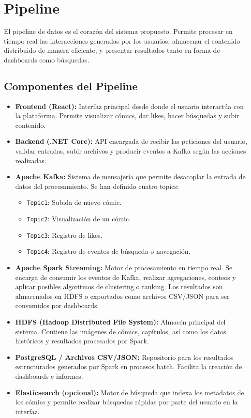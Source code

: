 \section{Pipeline}

El pipeline de datos es el corazón del sistema propuesto. Permite procesar en tiempo real las interacciones generadas por los usuarios, almacenar el contenido distribuido de manera eficiente, y presentar resultados tanto en forma de dashboards como búsquedas.

\subsection*{Componentes del Pipeline}

\begin{itemize}
    \item \textbf{Frontend (React):} Interfaz principal desde donde el usuario interactúa con la plataforma. Permite visualizar cómics, dar likes, hacer búsquedas y subir contenido.
    
    \item \textbf{Backend (.NET Core):} API encargada de recibir las peticiones del usuario, validar entradas, subir archivos y producir eventos a Kafka según las acciones realizadas.
    
    \item \textbf{Apache Kafka:} Sistema de mensajería que permite desacoplar la entrada de datos del procesamiento. Se han definido cuatro topics:
    \begin{itemize}
        \item \texttt{Topic1}: Subida de nuevo cómic.
        \item \texttt{Topic2}: Visualización de un cómic.
        \item \texttt{Topic3}: Registro de likes.
        \item \texttt{Topic4}: Registro de eventos de búsqueda o navegación.
    \end{itemize}
    
    \item \textbf{Apache Spark Streaming:} Motor de procesamiento en tiempo real. Se encarga de consumir los eventos de Kafka, realizar agregaciones, conteos y aplicar posibles algoritmos de clustering o ranking. Los resultados son almacenados en HDFS o exportados como archivos CSV/JSON para ser consumidos por dashboards.

    \item \textbf{HDFS (Hadoop Distributed File System):} Almacén principal del sistema. Contiene las imágenes de cómics, capítulos, así como los datos históricos y resultados procesados por Spark.
    
    \item \textbf{PostgreSQL / Archivos CSV/JSON:} Repositorio para los resultados estructurados generados por Spark en procesos batch. Facilita la creación de dashboards e informes.
    
    \item \textbf{Elasticsearch (opcional):} Motor de búsqueda que indexa los metadatos de los cómics y permite realizar búsquedas rápidas por parte del usuario en la interfaz.
\end{itemize}

